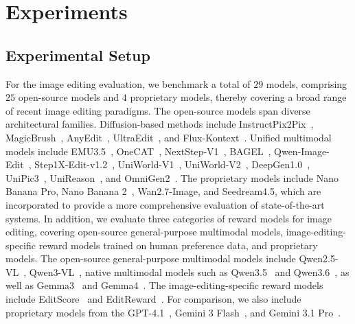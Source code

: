\section{Experiments}
\label{sec:experiments}
\subsection{Experimental Setup}
For the image editing evaluation, we benchmark a total of $29$ models, comprising $25$ open-source models and $4$ proprietary models, thereby covering a broad range of recent image editing paradigms.
The open-source models span diverse architectural families. Diffusion-based methods include InstructPix2Pix~\cite{brooks2023instructpix2pix}, MagicBrush~\cite{zhang2023magicbrush}, AnyEdit~\cite{yu2025anyedit}, UltraEdit~\cite{zhao2024ultraedit}, and Flux-Kontext~\cite{labs2025flux}. 
Unified multimodal models include  EMU3.5~\cite{cui2025emu3}, OneCAT~\cite{li2025onecat}, NextStep-V1~\cite{han2025nextstep}, BAGEL~\cite{deng2025emerging}, Qwen-Image-Edit~\cite{wu2025qwen}, Step1X-Edit-v1.2~\cite{liu2025step1x}, UniWorld-V1~\cite{lin2025uniworld},
UniWorld-V2~\cite{li2025uniworld},
DeepGen1.0~\cite{wang2026deepgen}, UniPic3~\cite{wei2026skywork}, UniReason~\cite{wang2026unireason}, and OmniGen2~\cite{wu2025omnigen2}.
The proprietary models include Nano Banana Pro\cite{gemini3pro}, Nano Banana 2~\cite{google2026gemini31flashimagepreview}, Wan2.7-Image\cite{wan}, and Seedream4.5\cite{seedream2025seedream}, which are incorporated to provide a more comprehensive evaluation of state-of-the-art systems. 
In addition, we evaluate three categories of reward models for image editing, covering open-source general-purpose multimodal models, image-editing-specific reward models trained on human preference data, and proprietary models. The open-source general-purpose multimodal models include Qwen2.5-VL~\cite{wang2024qwen2}, Qwen3-VL~\cite{bai2025qwen3}, native multimodal models such as Qwen3.5~\cite{qwen3.5} and Qwen3.6~\cite{qwen3.6-27b,qwen36_35b_a3b}, as well as Gemma3~\cite{Gemma3} and Gemma4~\cite{google2026gemma4}. 
The image-editing-specific reward models include EditScore~\cite{luo2025editscore} and EditReward~\cite{wu2025editreward}. 
For comparison, we also include proprietary models from the GPT-4.1~\cite{gpt4o20250325}, Gemini 3 Flash~\cite{google2026gemini31flashimagepreview}, and Gemini 3.1 Pro~\cite{google2026gemini31propreview}.  


